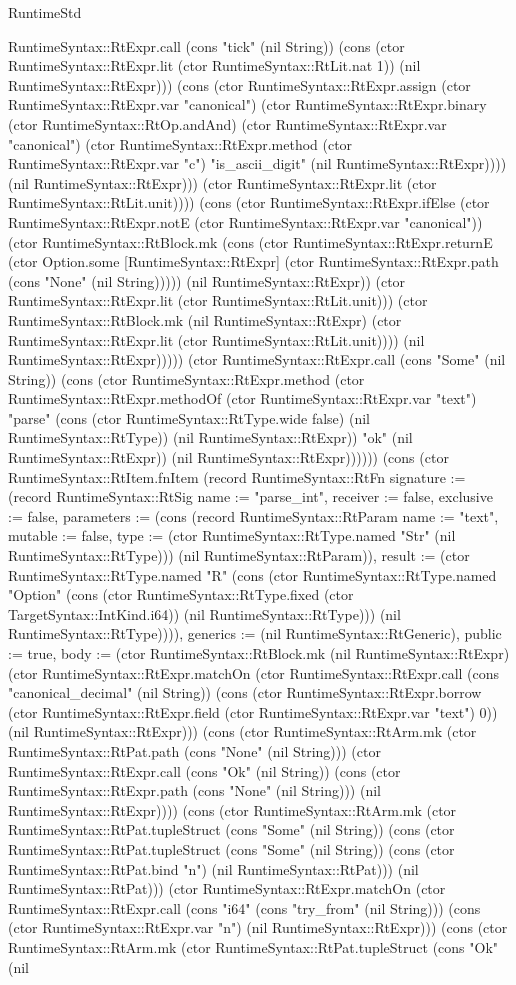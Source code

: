 \begin{lexlean}{RuntimeStd}
\begin{semanticmodule}
{RuntimeSyntax::RtExpr.call (cons "tick" (nil String)) (cons (ctor RuntimeSyntax::RtExpr.lit (ctor RuntimeSyntax::RtLit.nat 1)) (nil RuntimeSyntax::RtExpr))) (cons (ctor RuntimeSyntax::RtExpr.assign (ctor RuntimeSyntax::RtExpr.var "canonical") (ctor RuntimeSyntax::RtExpr.binary (ctor RuntimeSyntax::RtOp.andAnd) (ctor RuntimeSyntax::RtExpr.var "canonical") (ctor RuntimeSyntax::RtExpr.method (ctor RuntimeSyntax::RtExpr.var "c") "is_ascii_digit" (nil RuntimeSyntax::RtExpr)))) (nil RuntimeSyntax::RtExpr))) (ctor RuntimeSyntax::RtExpr.lit (ctor RuntimeSyntax::RtLit.unit)))) (cons (ctor RuntimeSyntax::RtExpr.ifElse (ctor RuntimeSyntax::RtExpr.notE (ctor RuntimeSyntax::RtExpr.var "canonical")) (ctor RuntimeSyntax::RtBlock.mk (cons (ctor RuntimeSyntax::RtExpr.returnE (ctor Option.some [RuntimeSyntax::RtExpr] (ctor RuntimeSyntax::RtExpr.path (cons "None" (nil String))))) (nil RuntimeSyntax::RtExpr)) (ctor RuntimeSyntax::RtExpr.lit (ctor RuntimeSyntax::RtLit.unit))) (ctor RuntimeSyntax::RtBlock.mk (nil RuntimeSyntax::RtExpr) (ctor RuntimeSyntax::RtExpr.lit (ctor RuntimeSyntax::RtLit.unit)))) (nil RuntimeSyntax::RtExpr))))) (ctor RuntimeSyntax::RtExpr.call (cons "Some" (nil String)) (cons (ctor RuntimeSyntax::RtExpr.method (ctor RuntimeSyntax::RtExpr.methodOf (ctor RuntimeSyntax::RtExpr.var "text") "parse" (cons (ctor RuntimeSyntax::RtType.wide false) (nil RuntimeSyntax::RtType)) (nil RuntimeSyntax::RtExpr)) "ok" (nil RuntimeSyntax::RtExpr)) (nil RuntimeSyntax::RtExpr))))})) (cons (ctor RuntimeSyntax::RtItem.fnItem (record RuntimeSyntax::RtFn {signature := (record RuntimeSyntax::RtSig {name := "parse_int", receiver := false, exclusive := false, parameters := (cons (record RuntimeSyntax::RtParam {name := "text", mutable := false, type := (ctor RuntimeSyntax::RtType.named "Str" (nil RuntimeSyntax::RtType))}) (nil RuntimeSyntax::RtParam)), result := (ctor RuntimeSyntax::RtType.named "R" (cons (ctor RuntimeSyntax::RtType.named "Option" (cons (ctor RuntimeSyntax::RtType.fixed (ctor TargetSyntax::IntKind.i64)) (nil RuntimeSyntax::RtType))) (nil RuntimeSyntax::RtType)))}), generics := (nil RuntimeSyntax::RtGeneric), public := true, body := (ctor RuntimeSyntax::RtBlock.mk (nil RuntimeSyntax::RtExpr) (ctor RuntimeSyntax::RtExpr.matchOn (ctor RuntimeSyntax::RtExpr.call (cons "canonical_decimal" (nil String)) (cons (ctor RuntimeSyntax::RtExpr.borrow (ctor RuntimeSyntax::RtExpr.field (ctor RuntimeSyntax::RtExpr.var "text") 0)) (nil RuntimeSyntax::RtExpr))) (cons (ctor RuntimeSyntax::RtArm.mk (ctor RuntimeSyntax::RtPat.path (cons "None" (nil String))) (ctor RuntimeSyntax::RtExpr.call (cons "Ok" (nil String)) (cons (ctor RuntimeSyntax::RtExpr.path (cons "None" (nil String))) (nil RuntimeSyntax::RtExpr)))) (cons (ctor RuntimeSyntax::RtArm.mk (ctor RuntimeSyntax::RtPat.tupleStruct (cons "Some" (nil String)) (cons (ctor RuntimeSyntax::RtPat.tupleStruct (cons "Some" (nil String)) (cons (ctor RuntimeSyntax::RtPat.bind "n") (nil RuntimeSyntax::RtPat))) (nil RuntimeSyntax::RtPat))) (ctor RuntimeSyntax::RtExpr.matchOn (ctor RuntimeSyntax::RtExpr.call (cons "i64" (cons "try_from" (nil String))) (cons (ctor RuntimeSyntax::RtExpr.var "n") (nil RuntimeSyntax::RtExpr))) (cons (ctor RuntimeSyntax::RtArm.mk (ctor RuntimeSyntax::RtPat.tupleStruct (cons "Ok" (nil }
\end{semanticmodule}
\end{lexlean}
